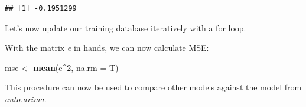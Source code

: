 \documentclass[]{article}
\newenvironment{Shaded}{\begin{snugshade}}{\end{snugshade}}
\newcommand{\CommentTok}[1]{\textcolor[rgb]{0.56,0.35,0.01}{\textit{#1}}}
\newcommand{\ControlFlowTok}[1]{\textcolor[rgb]{0.13,0.29,0.53}{\textbf{#1}}}
\newcommand{\DataTypeTok}[1]{\textcolor[rgb]{0.13,0.29,0.53}{#1}}
\newcommand{\DecValTok}[1]{\textcolor[rgb]{0.00,0.00,0.81}{#1}}
\newcommand{\KeywordTok}[1]{\textcolor[rgb]{0.13,0.29,0.53}{\textbf{#1}}}
\newcommand{\NormalTok}[1]{#1}
\newcommand{\OperatorTok}[1]{\textcolor[rgb]{0.81,0.36,0.00}{\textbf{#1}}}
\newcommand{\OtherTok}[1]{\textcolor[rgb]{0.56,0.35,0.01}{#1}}
\newcommand{\StringTok}[1]{\textcolor[rgb]{0.31,0.60,0.02}{#1}}
\begin{document}
\begin{verbatim}
## [1] -0.1951299
\end{verbatim}

Let's now update our training database iteratively with a for loop.

\begin{Shaded}
\end{Shaded}

With the matrix \emph{e} in hands, we can now calculate MSE:

\begin{Shaded}
\begin{Highlighting}[]
\NormalTok{mse <-}\StringTok{ }\KeywordTok{mean}\NormalTok{(e}\OperatorTok{^}\DecValTok{2}\NormalTok{, }\DataTypeTok{na.rm =}\NormalTok{ T)}
\end{Highlighting}
\end{Shaded}

This procedure can now be used to compare other models against the model
from \emph{auto.arima}.
\end{document}
